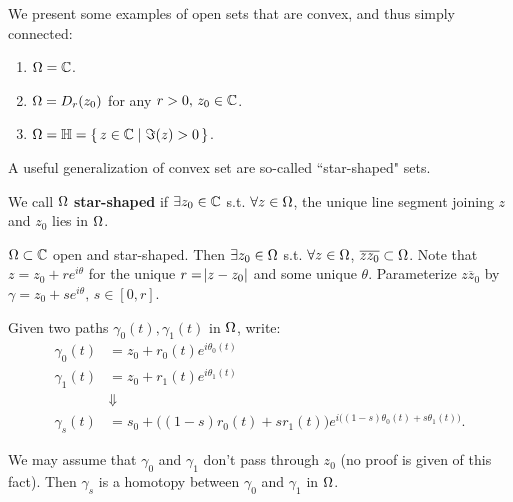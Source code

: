 \begin{example}
We present some examples of open sets that are convex, and thus simply connected:
\begin{enumerate}
    \item $\Omega = \mathbb{C}$.
    \item $\Omega = D_r(z_0)$ for any $r>0, \, z_0 \in \mathbb{C}$.
    \item $\Omega = \mathbb{H} = \set{ z \in \mathbb{C}\mid \Im (z) >0}$.
\end{enumerate}
\end{example}

A useful generalization of convex set are so-called ``star-shaped" sets.

\begin{definition}

We call $\Omega$ \textbf{star-shaped} if $\exists z_0 \in \mathbb{C}$ s.t. $\forall z \in \Omega$, the unique line segment joining $z$ and $z_0$ lies in $\Omega$.
\end{definition}

\begin{center}
\end{center}

\begin{remark}
$\Omega \subset \mathbb{C}$ open and star-shaped. Then $\exists z_0 \in \Omega$ s.t. $\forall z \in \Omega$, $\overline{z z_0} \subset \Omega$. Note that $z=z_0 + re^{i \theta} $ for the unique $r = \abs{z-z_0}$ and some unique $\theta$. Parameterize $\overline{z z_0}$ by $\gamma = z_0 + s e^{i \theta}, \, s \in [0,r]$.

Given two paths $\gamma_0 (t), \gamma_1 (t)$ in $\Omega$, write:
\begin{align*}
\gamma_0(t) &= z_0 + r_0 (t) e^{i \theta_0 (t)}\\
\gamma_1(t) &= z_0 + r_1 (t) e^{i \theta_1 (t)}\\
&\Downarrow\\
\gamma_s(t) &= s_0 + \big( (1-s)r_0(t) + sr_1(t) \big) e^{i \big( (1-s) \theta_0 (t) + s \theta_1 (t) \big)} .
\end{align*}


We may assume that $\gamma_0$ and $\gamma_1$ don't pass through $z_0$ (no proof is given of this fact). Then $\gamma_s$ is a homotopy between $\gamma_0$ and $\gamma_1$ in $\Omega$.

\end{remark}


